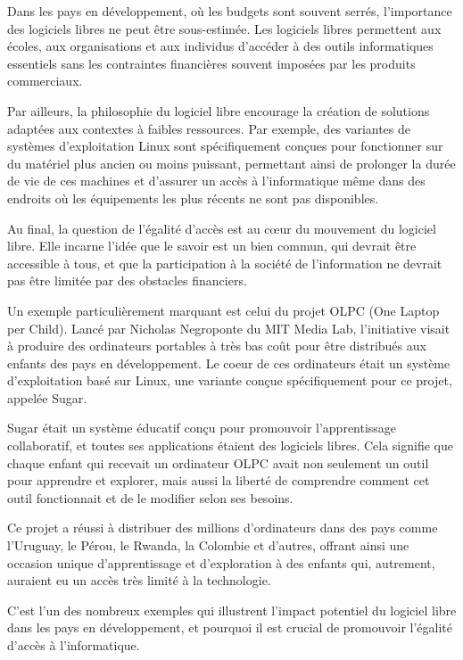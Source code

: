 Dans les pays en développement, où les budgets sont souvent serrés, l'importance des logiciels libres ne peut être sous-estimée. Les logiciels libres permettent aux écoles, aux organisations et aux individus d'accéder à des outils informatiques essentiels sans les contraintes financières souvent imposées par les produits commerciaux.

Par ailleurs, la philosophie du logiciel libre encourage la création de solutions adaptées aux contextes à faibles ressources. Par exemple, des variantes de systèmes d'exploitation Linux sont spécifiquement conçues pour fonctionner sur du matériel plus ancien ou moins puissant, permettant ainsi de prolonger la durée de vie de ces machines et d'assurer un accès à l'informatique même dans des endroits où les équipements les plus récents ne sont pas disponibles.

Au final, la question de l'égalité d'accès est au cœur du mouvement du logiciel libre. Elle incarne l'idée que le savoir est un bien commun, qui devrait être accessible à tous, et que la participation à la société de l'information ne devrait pas être limitée par des obstacles financiers.

Un exemple particulièrement marquant est celui du projet OLPC (One Laptop per Child). Lancé par Nicholas Negroponte du MIT Media Lab, l'initiative visait à produire des ordinateurs portables à très bas coût pour être distribués aux enfants des pays en développement. Le coeur de ces ordinateurs était un système d'exploitation basé sur Linux, une variante conçue spécifiquement pour ce projet, appelée Sugar.

Sugar était un système éducatif conçu pour promouvoir l'apprentissage collaboratif, et toutes ses applications étaient des logiciels libres. Cela signifie que chaque enfant qui recevait un ordinateur OLPC avait non seulement un outil pour apprendre et explorer, mais aussi la liberté de comprendre comment cet outil fonctionnait et de le modifier selon ses besoins. 

Ce projet a réussi à distribuer des millions d'ordinateurs dans des pays comme l'Uruguay, le Pérou, le Rwanda, la Colombie et d'autres, offrant ainsi une occasion unique d'apprentissage et d'exploration à des enfants qui, autrement, auraient eu un accès très limité à la technologie. 

C'est l'un des nombreux exemples qui illustrent l'impact potentiel du logiciel libre dans les pays en développement, et pourquoi il est crucial de promouvoir l'égalité d'accès à l'informatique.
\cite{openedition}

